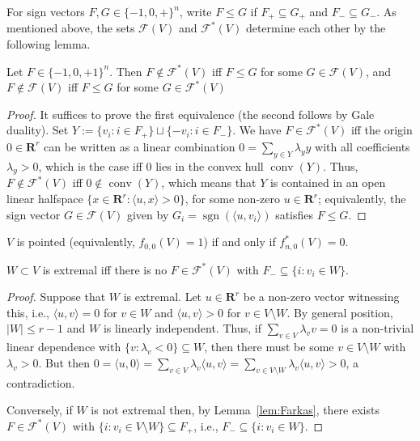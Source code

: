 \documentclass[a4paper,USenglish,cleveref, autoref, thm-restate,nolineno]{socg-lipics-v2021}
\DeclareMathOperator{\sgn}{sgn}
\DeclareMathOperator{\conv}{conv}
\renewcommand{\leq}{\leqslant}
\newcommand{\R}{\mathbf{R}}
\begin{document}
For sign vectors $F,G \in \{-1,0,+\}^n$, write $F\leq G$ if $F_+ \subseteq G_+$ and $F_- \subseteq G_-$. As mentioned above, the sets $\mathcal{F}(V)$ and $\mathcal{F}^*(V)$ determine each other by the following lemma. 
\begin{lemma}
\label{lem:Farkas}
Let $F\in \{-1,0,+1\}^n$. Then $F\not\in \mathcal{F}^*(V)$ iff $F\leq G$ for some $G\in \mathcal{F}(V)$, and $F\not\in \mathcal{F}(V)$ iff $F\leq G$ for some $G\in \mathcal{F}^*(V)$
\end{lemma}
\begin{proof}
It suffices to prove the first equivalence (the second follows by Gale duality). Set $Y:=\{v_i \colon i\in F_+\} \sqcup \{-v_i \colon i\in F_-\}$. We have $F\in \mathcal{F}^*(V)$ iff the origin $0\in \R^r$ can be written as a linear combination 
$0=\sum_{y \in Y} \lambda_y y$ with all coefficients $\lambda_y>0$, which is the case iff $0$ lies in the convex hull $\conv(Y)$. Thus, $F\not\in \mathcal{F}^*(V)$ iff $0\not\in \conv(Y)$, which means that $Y$ is contained in an open linear halfspace $\{x\in \R^r\colon \langle u,x\rangle >0\}$, for some non-zero $u\in \R^r$; equivalently, the sign vector $G\in \mathcal{F}(V)$ given by $G_i =\sgn(\langle u,v_i\rangle)$ satisfies $F\leq G$.
\end{proof}
\begin{corollary}
$V$ is pointed (equivalently, $f_{0,0}(V)=1$) if and only if $f^*_{n,0}(V)=0$.
\end{corollary}

\begin{lemma} 
\label{lem:char-extremal}
$W \subset V$ is extremal iff there is no $F\in \mathcal{F}^*(V)$ with $F_- \subseteq \{i\colon v_i \in W\}$.
\end{lemma}
\begin{proof}
Suppose that $W$ is extremal. Let $u\in \R^r$ be a non-zero vector witnessing this, i.e., $\langle u, v\rangle =0$ for $v \in W$ and $\langle u, v\rangle >0$ for $v\in V\setminus W$. By general position, $|W|\leq r-1$ and $W$ is linearly independent. Thus, if $\sum_{v\in V} \lambda_v v=0$ is a non-trivial linear dependence with $\{v \colon \lambda_v<0\}\subseteq W$, then there must be some $v \in V\setminus W$  with $\lambda_v > 0$. But then $0=\langle u,0\rangle = \sum_{v\in V} \lambda_v \langle u,v\rangle =\sum_{v\in V\setminus W} \lambda_v \langle u,v\rangle >0$, a contradiction.

Conversely, if $W$ is not extremal then, by Lemma~\ref{lem:Farkas}, there exists $F \in \mathcal{F}^*(V)$ with $\{i \colon v_i\in V\setminus W\} \subseteq F_+$, i.e., $F_- \subseteq \{i\colon v_i \in W\}$.
\end{proof}
\end{document}
